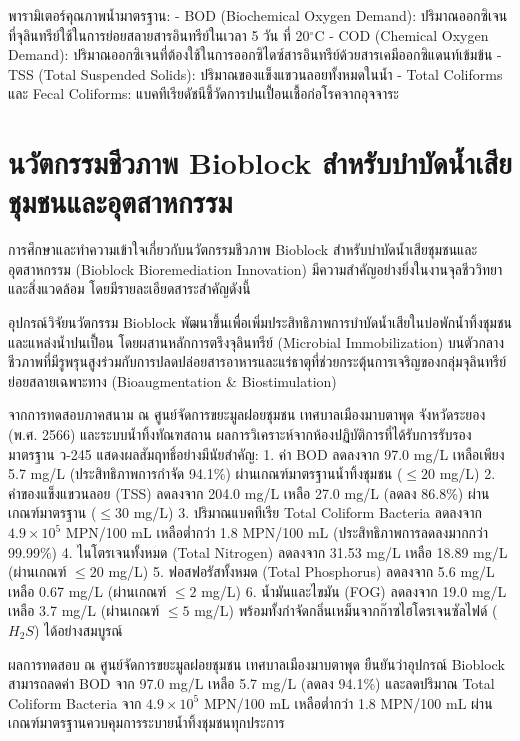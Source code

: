 พารามิเตอร์คุณภาพน้ำมาตรฐาน:
- BOD (Biochemical Oxygen Demand): ปริมาณออกซิเจนที่จุลินทรีย์ใช้ในการย่อยสลายสารอินทรีย์ในเวลา 5 วัน ที่ 20$^{\circ}$C
- COD (Chemical Oxygen Demand): ปริมาณออกซิเจนที่ต้องใช้ในการออกซิไดซ์สารอินทรีย์ด้วยสารเคมีออกซิแดนท์เข้มข้น
- TSS (Total Suspended Solids): ปริมาณของแข็งแขวนลอยทั้งหมดในน้ำ
- Total Coliforms และ Fecal Coliforms: แบคทีเรียดัชนีชี้วัดการปนเปื้อนเชื้อก่อโรคจากอุจจาระ

\section{นวัตกรรมชีวภาพ Bioblock สำหรับบำบัดน้ำเสียชุมชนและอุตสาหกรรม}

การศึกษาและทำความเข้าใจเกี่ยวกับนวัตกรรมชีวภาพ Bioblock สำหรับบำบัดน้ำเสียชุมชนและอุตสาหกรรม (Bioblock Bioremediation Innovation) มีความสำคัญอย่างยิ่งในงานจุลชีววิทยาและสิ่งแวดล้อม โดยมีรายละเอียดสาระสำคัญดังนี้

อุปกรณ์วิจัยนวัตกรรม Bioblock พัฒนาขึ้นเพื่อเพิ่มประสิทธิภาพการบำบัดน้ำเสียในบ่อพักน้ำทิ้งชุมชนและแหล่งน้ำปนเปื้อน โดยผสานหลักการตรึงจุลินทรีย์ (Microbial Immobilization) บนตัวกลางชีวภาพที่มีรูพรุนสูงร่วมกับการปลดปล่อยสารอาหารและแร่ธาตุที่ช่วยกระตุ้นการเจริญของกลุ่มจุลินทรีย์ย่อยสลายเฉพาะทาง (Bioaugmentation \& Biostimulation)

จากการทดสอบภาคสนาม ณ ศูนย์จัดการขยะมูลฝอยชุมชน เทศบาลเมืองมาบตาพุด จังหวัดระยอง (พ.ศ. 2566) และระบบน้ำทิ้งทัณฑสถาน ผลการวิเคราะห์จากห้องปฏิบัติการที่ได้รับการรับรองมาตรฐาน ว-245 แสดงผลสัมฤทธิ์อย่างมีนัยสำคัญ:
1. ค่า BOD ลดลงจาก 97.0 mg/L เหลือเพียง 5.7 mg/L (ประสิทธิภาพการกำจัด 94.1\%) ผ่านเกณฑ์มาตรฐานน้ำทิ้งชุมชน ($\le 20$ mg/L)
2. ค่าของแข็งแขวนลอย (TSS) ลดลงจาก 204.0 mg/L เหลือ 27.0 mg/L (ลดลง 86.8\%) ผ่านเกณฑ์มาตรฐาน ($\le 30$ mg/L)
3. ปริมาณแบคทีเรีย Total Coliform Bacteria ลดลงจาก $4.9 \times 10^5$ MPN/100 mL เหลือต่ำกว่า 1.8 MPN/100 mL (ประสิทธิภาพการลดลงมากกว่า 99.99\%)
4. ไนโตรเจนทั้งหมด (Total Nitrogen) ลดลงจาก 31.53 mg/L เหลือ 18.89 mg/L (ผ่านเกณฑ์ $\le 20$ mg/L)
5. ฟอสฟอรัสทั้งหมด (Total Phosphorus) ลดลงจาก 5.6 mg/L เหลือ 0.67 mg/L (ผ่านเกณฑ์ $\le 2$ mg/L)
6. น้ำมันและไขมัน (FOG) ลดลงจาก 19.0 mg/L เหลือ 3.7 mg/L (ผ่านเกณฑ์ $\le 5$ mg/L) พร้อมทั้งกำจัดกลิ่นเหม็นจากก๊าซไฮโดรเจนซัลไฟด์ ($H_2S$) ได้อย่างสมบูรณ์

\begin{casebox}
ผลการทดสอบ ณ ศูนย์จัดการขยะมูลฝอยชุมชน เทศบาลเมืองมาบตาพุด ยืนยันว่าอุปกรณ์ Bioblock สามารถลดค่า BOD จาก 97.0 mg/L เหลือ 5.7 mg/L (ลดลง 94.1\%) และลดปริมาณ Total Coliform Bacteria จาก $4.9\times 10^5$ MPN/100 mL เหลือต่ำกว่า 1.8 MPN/100 mL ผ่านเกณฑ์มาตรฐานควบคุมการระบายน้ำทิ้งชุมชนทุกประการ
\end{casebox}

